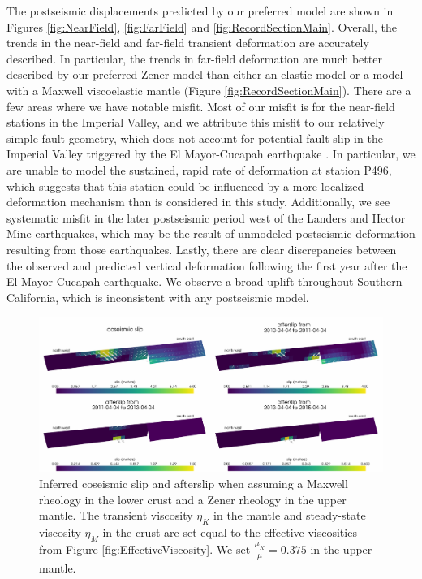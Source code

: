 \documentclass[draft,linenumbers]{AGUJournal}
\begin{document}
The postseismic displacements predicted by our preferred model are shown in Figures \ref{fig:NearField}, \ref{fig:FarField} and \ref{fig:RecordSectionMain}.  Overall, the trends in the near-field and far-field transient deformation are accurately described.  In particular, the trends in far-field deformation are much better described by our preferred Zener model than either an elastic model or a model with a Maxwell viscoelastic mantle (Figure \ref{fig:RecordSectionMain}).  There are a few areas where we have notable misfit.  Most of our misfit is for the near-field stations in the Imperial Valley, and we attribute this misfit to our relatively simple fault geometry, which does not account for potential fault slip in the Imperial Valley triggered by the El Mayor-Cucapah earthquake \citep{Wei2011a,Wei2015}. In particular, we are unable to model the sustained, rapid rate of deformation at station P496, which suggests that this station could be influenced by a more localized deformation mechanism than is considered in this study.  Additionally, we see systematic misfit in the later postseismic period west of the Landers and Hector Mine earthquakes, which may be the result of unmodeled postseismic deformation resulting from those earthquakes.  Lastly, there are clear discrepancies between the observed and predicted vertical deformation following the first year after the El Mayor Cucapah earthquake. We observe a broad uplift throughout Southern California, which is inconsistent with any postseismic model.

\begin{figure}
\includegraphics[scale=0.9]{Figures/FinalSlip}
\centering 
\caption{Inferred coseismic slip and afterslip when assuming a Maxwell rheology in the lower crust and a Zener rheology in the upper mantle.  The transient viscosity $\eta_K$ in the mantle and steady-state viscosity $\eta_M$ in the crust are set equal to the effective viscosities from Figure \ref{fig:EffectiveViscosity}. We set $\frac{\mu_K}{\mu}=0.375$ in the upper mantle.}
\label{fig:FinalSlip}
\end{figure}
  
\end{document}
